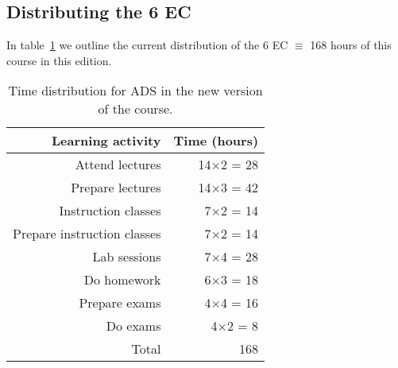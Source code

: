 \subsection{Distributing the 6 EC}
\label{sub:distributing_the_6_ec}

In table~\ref{tab:dist} we outline the current distribution of the 6 EC $\equiv$ 168 hours of this course in this
edition.

\begin{table}[htpb]
	\centering
	\caption{Time distribution for ADS in the new version of the course.}
	\label{tab:dist}
	\begin{tabular}{r | r }
		Learning activity & Time (hours)\\
		\hline
		Attend lectures & 14$\times$2 = 28 \\
		Prepare lectures & 14$\times$3 = 42 \\
		Instruction classes & 7$\times$2 = 14  \\
		Prepare instruction classes & 7$\times$2 = 14\\
		Lab sessions & 7$\times$4 = 28  \\
		Do homework & 6$\times$3 = 18  \\
		Prepare exams & 4$\times$4 = 16 \\
		Do exams & 4$\times$2 = 8 \\
		\hline
		Total & 168 \\
	\end{tabular}
\end{table}
